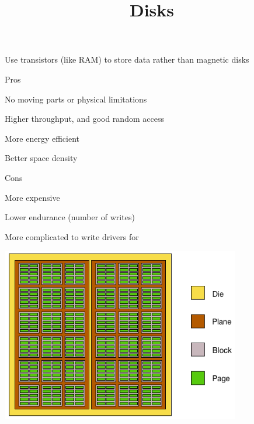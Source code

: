 
\usepackage{svg}

\title{Disks}



\begin{frame}
  \titlepage
\end{frame}

\begin{slide}
  

  Use transistors (like RAM) to store data rather than magnetic disks
  \medskip

  Pros

  \leftspace{}No moving parts or physical limitations

  \leftspace{}Higher throughput, and good random access

  \leftspace{}More energy efficient

  \leftspace{}Better space density
  \medskip

  Cons

  \leftspace{}More expensive

  \leftspace{}Lower endurance (number of writes)

  \leftspace{}More complicated to write drivers for

\end{slide}

\begin{slide}
  

  \begin{center}
    \includegraphics[height=0.8\textheight]{ssd.png}    
  \end{center}

\end{slide}

